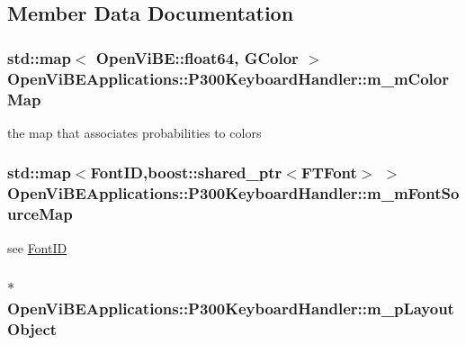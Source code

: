 \subsection{Member Data Documentation}
\hypertarget{classOpenViBEApplications_1_1P300KeyboardHandler_a6698e3da5de1ca1361ca0051380c70a4}{
\subsubsection[{m\_\-mColorMap}]{\setlength{\rightskip}{0pt plus 5cm}std::map$<$ OpenViBE::float64, {\bf GColor} $>$ {\bf OpenViBEApplications::P300KeyboardHandler::m\_\-mColorMap}}}
\label{classOpenViBEApplications_1_1P300KeyboardHandler_a6698e3da5de1ca1361ca0051380c70a4}
the map that associates probabilities to colors \hypertarget{classOpenViBEApplications_1_1P300KeyboardHandler_a1a8f42a263a88dd6e6bab7f0ab690b79}{
\subsubsection[{m\_\-mFontSourceMap}]{\setlength{\rightskip}{0pt plus 5cm}std::map$<${\bf FontID},boost::shared\_\-ptr$<$FTFont$>$ $>$ {\bf OpenViBEApplications::P300KeyboardHandler::m\_\-mFontSourceMap}}}
\label{classOpenViBEApplications_1_1P300KeyboardHandler_a1a8f42a263a88dd6e6bab7f0ab690b79}
see \hyperlink{structOpenViBEApplications_1_1P300KeyboardHandler_1_1FontID}{FontID} \hypertarget{classOpenViBEApplications_1_1P300KeyboardHandler_a1fd87979441e2834eef9f3f363f49561}{
\subsubsection[{m\_\-pLayoutObject}]{$\ast$ {\bf OpenViBEApplications::P300KeyboardHandler::m\_\-pLayoutObject}}}
